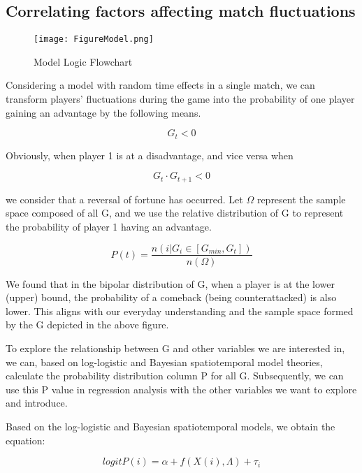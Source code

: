 \documentclass[12pt]{article}
\begin{document}
\subsection{Correlating factors affecting match fluctuations}

\begin{figure}[H]
	\centering
	\texttt{[image: FigureModel.png]}
	\caption{Model Logic Flowchart}\label{fig:figmo}
\end{figure}

Considering a model with random time effects in a single match, we can transform players' fluctuations during the game into the probability of one player gaining an advantage by the following means.

\begin{equation}\label{eq:g}
	G_t < 0
\end{equation}

Obviously, when player 1 is at a disadvantage, and vice versa when

\begin{equation}\label{eq:gt}
G_{t}\cdot G_{t+1} < 0
\end{equation}

we consider that a reversal of fortune has occurred. Let $\Omega$ represent the sample space composed of all G, and we use the relative distribution of G to represent the probability of player 1 having an advantage.

\begin{equation}\label{eq:gt}
P(t) = \frac{n(i|G_i\in[G_{min},G_t])}{n(\Omega)}
\end{equation}

We found that in the bipolar distribution of G, when a player is at the lower (upper) bound, the probability of a comeback (being counterattacked) is also lower. This aligns with our everyday understanding and the sample space formed by the G depicted in the above figure.

To explore the relationship between G and other variables we are interested in, we can, based on log-logistic and Bayesian spatiotemporal model theories, calculate the probability distribution column P for all G. Subsequently, we can use this P value in regression analysis with the other variables we want to explore and introduce.

Based on the log-logistic and Bayesian spatiotemporal models, we obtain the equation:

\begin{equation}\label{eq:gt}
	logit P(i) = \alpha + f(X(i),\Lambda) + \tau_i
\end{equation}
\end{document}
